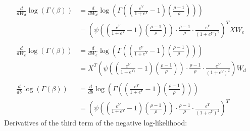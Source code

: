 \documentclass[12pt,a4paper]{article}
\begin{document}
\begin{align*}
\frac{d}{d W_{d}} \log(\Gamma(\beta)) &= \frac{d}{d W_{d}} \log\left(\Gamma\left(\left(\frac{e^{Y}}{1+e^{Y}} - 1\right)\left(\frac{\rho - 1}{\rho}\right)\right)\right)\\
	&= \left(\psi\left(\left(\frac{e^{Y}}{1+e^{Y}} - 1\right)\left(\frac{\rho - 1}{\rho}\right) \right) \cdot \frac{\rho - 1}{\rho} \cdot \frac{e^{Y}}{\left(1+e^{Y}\right)^2} \right)^T XW_e \\
	\ \\
\frac{d}{d W_{e}} \log(\Gamma(\beta)) &= \frac{d}{d W_{e}} \log\left(\Gamma\left(\left(\frac{e^{Y}}{1+e^{Y}} - 1\right)\left(\frac{\rho - 1}{\rho}\right)\right)\right)\\
&= X^T \left(\psi\left(\left(\frac{e^{Y}}{1+e^{Y)}} - 1\right)\left(\frac{\rho - 1}{\rho}\right) \right) \cdot \frac{\rho - 1}{\rho} \cdot \frac{e^{Y}}{\left(1+e^{Y}\right)^2} \right) W_d \\
\ \\
\frac{d}{d b} \log(\Gamma(\beta)) &= \frac{d}{d b} \log\left(\Gamma\left(\left(\frac{e^{Y}}{1+e^{Y}} - 1\right)\left(\frac{\rho - 1}{\rho}\right)\right)\right)\\
&= \left(\psi\left(\left(\frac{e^{Y}}{1+e^{Y}} - 1\right)\left(\frac{\rho - 1}{\rho}\right) \right) \cdot \frac{\rho - 1}{\rho} \cdot \frac{e^{Y}}{\left(1+e^{Y}\right)^2} \right)^T
\end{align*}
Derivatives of the third term of the negative log-likelihood:
\end{document}
